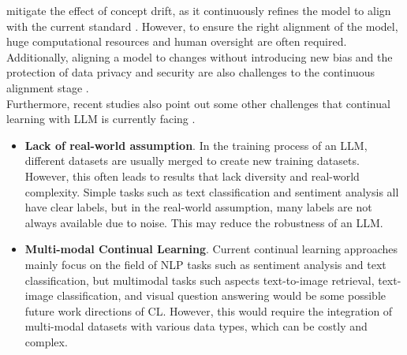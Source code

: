 \documentclass[runningheads]{llncs}
\begin{document}
mitigate the effect of concept drift, as it continuously refines the model to align with the current standard \cite{Taori23}.
However, to ensure the right alignment of the model, huge computational resources and human oversight are often required. Additionally, aligning a model to changes without introducing new bias and the protection of data
privacy and security are also challenges to the continuous alignment stage \cite{Shi24}. \\
\noindent \newline
Furthermore, recent studies also point out some other challenges that continual learning with LLM is currently facing \cite{Yang24}.
\begin{itemize}
  \item \textbf{Lack of real-world assumption}. In the training process of an LLM, different datasets are usually merged to create new training datasets. However, this often leads to results that
  lack diversity and real-world complexity. Simple tasks such as text classification and sentiment analysis all have clear labels, but in the real-world assumption, many labels are not always available 
  due to noise. This may reduce the robustness of an LLM.  
  \item \textbf{Multi-modal Continual Learning}. Current continual learning approaches mainly focus on the field of NLP tasks such as sentiment analysis and text classification, but multimodal tasks such aspects
  text-to-image retrieval, text-image classification, and visual question answering would be some possible future work directions of CL. However, this would require the integration of multi-modal datasets with various data types,
  which can be costly and complex. 
\end{itemize} 
\end{document}
